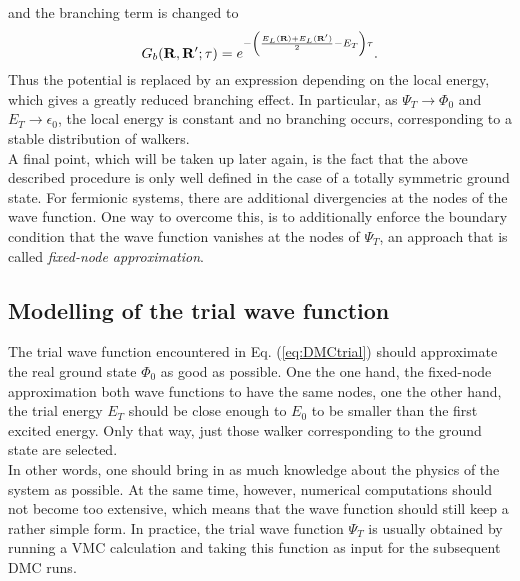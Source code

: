 and the branching term is changed to
\begin{equation}
G_b(\mathbf{R},\mathbf{R}';\tau) = e^{-\lb \frac{E_L(\mathbf{R})+E_L(\mathbf{R}')}{2}-E_T\rb \tau}.
\label{eq:branching}
\end{equation}
Thus the potential is replaced by an expression depending on the local energy, which gives a greatly reduced branching effect. In particular, as $\Psi_T \rightarrow \Phi_0$ and $E_T \rightarrow \epsilon_0$, the local energy is constant and no branching occurs, corresponding to a stable distribution of walkers. \\
A final point, which will be taken up later again, is the fact that the above described procedure is only well defined in the case of a totally symmetric ground state. For fermionic systems, there are additional divergencies at the nodes of the wave function. One way to overcome this, is to additionally enforce the boundary condition that the wave function vanishes at the nodes of $\Psi_T$, an approach that is called \textit{fixed-node approximation}.

\subsection{Modelling of the trial wave function}
The trial wave function encountered in Eq. (\ref{eq:DMCtrial}) should approximate the real ground state $\Phi_0$ as good as possible. One the one hand, the fixed-node approximation both wave functions to have the same nodes, one the other hand, the trial energy $E_T$ should be close enough to $E_0$ to be smaller than the first excited energy. Only that way, just those walker corresponding to the ground state are selected.\\
In other words, one should bring in as much knowledge about the physics of the system as possible. At the same time, however, numerical computations should not become too extensive, which means that the wave function should still keep a rather simple form.
In practice, the trial wave function $\Psi_T$ is usually obtained by running a VMC calculation and taking this function as input for the subsequent DMC runs.

